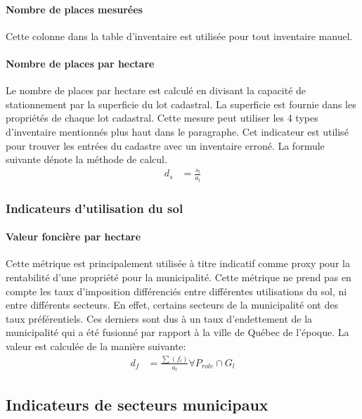     \paragraph{Nombre de places mesurées} Cette colonne dans la table d'inventaire est utilisée pour tout inventaire manuel.  
    
    \paragraph{Nombre de places par hectare} Le nombre de places par hectare est calculé en divisant la capacité de stationnement par la superficie du lot cadastral. La superficie est fournie dans les propriétés de chaque lot cadastral. Cette mesure peut utiliser les 4 types d'inventaire mentionnés plus haut dans le paragraphe. Cet indicateur est utilisé pour trouver les entrées du cadastre avec un inventaire erroné. La formule suivante dénote la méthode de calcul. 
    \begin{align}
        d_s &= \frac{s_l}{a_l} 
    \end{align}
    \subsubsection{Indicateurs d'utilisation du sol}
    \paragraph{Valeur foncière par hectare}
    Cette métrique est principalement utilisée à titre indicatif comme proxy pour la rentabilité d'une propriété pour la municipalité. Cette métrique ne prend pas en compte les taux d'imposition différenciés entre différentes utilisations du sol, ni entre différents secteurs. En effet, certains secteurs de la municipalité ont des taux préférentiels. Ces derniers sont dus à un taux d'endettement de la municipalité qui a été fusionné par rapport à la ville de Québec de l'époque. La valeur est calculée de la manière suivante:
    \begin{align}
        d_f &= \frac{\sum{\left(f_l\right)} }{a_l}\forall P_{role}\cap G_l
    \end{align}
    \subsection{Indicateurs de secteurs municipaux} 
